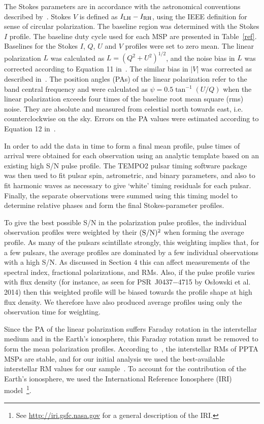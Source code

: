 \documentclass[useAMS,usenatbib]{mn2e}
\begin{document}
The Stokes parameters are in accordance with the astronomical conventions described 
by~\citet{vanStraten10}. Stokes $V$ is defined as $I_{\rm{LH}}-I_{\rm{RH}}$, 
using the IEEE definition for sense of circular polarization. 
%
The baseline region was determined with the Stokes $I$ profile. The baseline duty 
cycle used for each MSP are presented in Table~\ref{ref}. Baselines for 
the Stokes $I$, $Q$, $U$ and $V$ profiles were set to zero mean.
%
The linear polarization $L$ was calculated as $L=(Q^2+U^2)^{1/2}$, and the 
noise bias in $L$ was corrected according to Equation 11 in~\citet{Everett01}. 
The similar bias in $|V|$ was corrected as described in~\citet{Yan11}.
%
The position angles (PAs) of the linear polarization refer to the band central 
frequency and were calculated as $\psi=0.5\tan^{-1}(U/Q)$ when the linear 
polarization exceeds four times of the baseline root mean square (rms) noise. 
They are absolute and measured from celestial north towards east, i.e. 
counterclockwise on the sky.
%
Errors on the PA values were estimated according to Equation 12 in~\citet{Everett01}.
%

In order to add the data in time to form a final mean profile, pulse times of arrival 
were obtained for each observation using an analytic template based on an existing 
high S/N pulse profile. The TEMPO2 pulsar timing software package~\citep{Hobbs06}  
was then used to fit pulsar spin, astrometric, and binary parameters, and also to fit 
harmonic waves as necessary to give ‘white’ timing residuals for each pulsar. Finally, 
the separate observations were summed using this timing model to determine relative 
phases and form the final Stokes-parameter profiles. 
%

To give the best possible S/N in the polarization pulse profiles, the individual 
observation profiles were weighted by their $(\rm{S/N})^2$ when forming the average profile. 
%
As many of the pulsars scintillate strongly, this weighting implies that, for a few pulsars, 
the average profiles are dominated by a few individual observations with a high S/N. As discussed in 
Section $4$ this can affect measurements of the spectral index, fractional polarizations, and 
RMs. Also, if the pulse profile varies with flux density (for instance, 
as seen for PSR~J0437$-$4715 by Os{\l}owski et al. 2014) then this weighted profile will be 
biased towards the profile shape at high flux density. We therefore have also produced 
average profiles using only the observation time for weighting. 

Since the PA of the linear polarization suffers Faraday rotation in the interstellar medium
and in the Earth's ionosphere, this Faraday rotation must be removed to form the mean polarization 
profiles.
%
According to~\citet{Yan11b}, the interstellar RMs of PPTA MSPs are stable, and for our initial analysis we 
used the best-available interstellar RM values for our sample~\citep{Keith11,Yan11,Keith12,Burgay13}.
%
To account for the contribution of the Earth's ionosphere, we used the International 
Reference Ionosphere (IRI) model~\footnote{See \url{http://iri.gsfc.nasa.gov} for a general description
of the IRI.}. 
%
\end{document}
